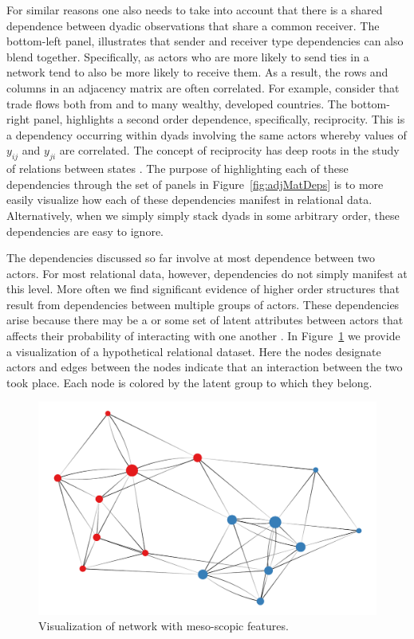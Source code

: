 For similar reasons one also needs to take into account that there is a shared dependence between dyadic observations that share a common receiver. The bottom-left panel, illustrates that sender and receiver type dependencies can also blend together. Specifically, as actors who are more likely to send ties in a network tend to also be more likely to receive them. As a result, the rows and columns in an adjacency matrix are often correlated. For example, consider that trade flows both from and to many wealthy, developed countries. The bottom-right panel, highlights a second order dependence, specifically, reciprocity. This is a dependency occurring within dyads involving the same actors whereby values of $y_{ij}$ and $y_{ji}$ are correlated. The concept of reciprocity has deep roots in the study of relations between states \citep{richardson:1960,keohane:1989}. The purpose of highlighting each of these dependencies through the set of panels in Figure~\ref{fig:adjMatDeps} is to more easily visualize how each of these dependencies manifest in relational data. Alternatively, when we simply simply stack dyads in some arbitrary order, these dependencies are easy to ignore.

The dependencies discussed so far involve at most dependence between two actors. For most relational data, however, dependencies do not simply manifest at this level. More often we find significant evidence of higher order structures that result from dependencies between multiple groups of actors. These dependencies arise because there may be a or some set of latent attributes between actors that affects their probability of interacting with one another \citep{wasserman:faust:1994,zinnes:1967}. In Figure~\ref{fig:thirdDeps} we provide a visualization of a hypothetical relational dataset. Here the nodes designate actors and edges between the nodes indicate that an interaction between the two took place. Each node is colored by the latent group to which they belong. 

\begin{figure}[ht]
	\includegraphics[width=.7\textwidth]{stochEquiv.pdf}
	\caption{Visualization of network with meso-scopic features.}
	\label{fig:thirdDeps}
\end{figure}

